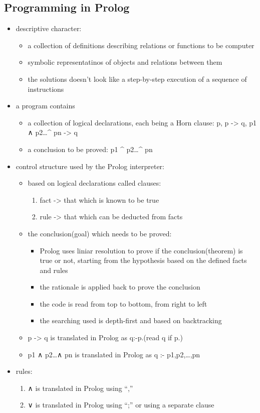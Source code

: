\documentclass[11pt]{article}
\begin{document}
\subsection{Programming in Prolog}
\label{sec:org2d73b8f}
\begin{itemize}
\item descriptive character:
\begin{itemize}
\item a collection of definitions describing relations or functions to be computer
\item symbolic representatinos of objects and relations between them
\item the solutions doesn't look like a step-by-step execution of a sequence of instructions
\end{itemize}
\item a program contains
\begin{itemize}
\item a collection of logical declarations, each being a Horn clause: p, p -> q, p1 ∧ p2\ldots{}\^{} pn -> q
\item a conclusion to be proved: p1 \^{} p2\ldots{}\^{} pn
\end{itemize}
\item control structure used by the Prolog interpreter:
\begin{itemize}
\item based on logical declarations called clauses:
\begin{enumerate}
\item fact -> that which is known to be true
\item rule -> that which can be deducted from facts
\end{enumerate}
\item the conclusion(goal) which needs to be proved:
\begin{itemize}
\item Prolog uses liniar resolution to prove if the conclusion(theorem) is true or not, starting from the hypothesis based on the defined facts and rules
\item the rationale is applied back to prove the conclusion
\item the code is read from top to bottom, from right to left
\item the searching used is depth-first and based on backtracking
\end{itemize}
\item p -> q is translated in Prolog as q:-p.(read q if p.)
\item p1 ∧ p2\ldots{}∧ pn is translated in Prolog as q :- p1,p2,\ldots{},pn
\end{itemize}
\item rules:
\begin{enumerate}
\item ∧ is translated in Prolog using ``,''
\item ∨ is translated in Prolog using ``;'' or using a separate clause
\end{enumerate}
\end{itemize}
\end{document}
